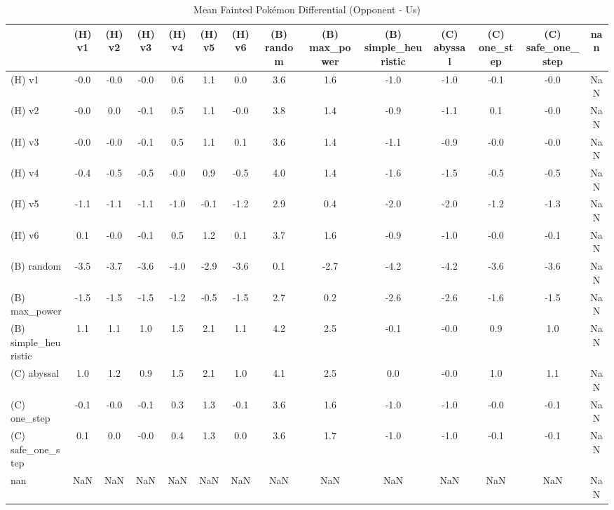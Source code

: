 \begin{table}[htbp]
\caption{Mean Fainted Pokémon Differential (Opponent - Us)}
\label{tab:fainted_diff}
\begin{tabular}{lccccccccccccc}
\hline
 & (H) v1 & (H) v2 & (H) v3 & (H) v4 & (H) v5 & (H) v6 & (B) random & (B) max\_power & (B) simple\_heuristic & (C) abyssal & (C) one\_step & (C) safe\_one\_step & nan \\
\hline
(H) v1 & -0.0 & -0.0 & -0.0 & 0.6 & 1.1 & 0.0 & 3.6 & 1.6 & -1.0 & -1.0 & -0.1 & -0.0 & NaN \\
(H) v2 & -0.0 & 0.0 & -0.1 & 0.5 & 1.1 & -0.0 & 3.8 & 1.4 & -0.9 & -1.1 & 0.1 & -0.0 & NaN \\
(H) v3 & -0.0 & -0.0 & -0.1 & 0.5 & 1.1 & 0.1 & 3.6 & 1.4 & -1.1 & -0.9 & -0.0 & -0.0 & NaN \\
(H) v4 & -0.4 & -0.5 & -0.5 & -0.0 & 0.9 & -0.5 & 4.0 & 1.4 & -1.6 & -1.5 & -0.5 & -0.5 & NaN \\
(H) v5 & -1.1 & -1.1 & -1.1 & -1.0 & -0.1 & -1.2 & 2.9 & 0.4 & -2.0 & -2.0 & -1.2 & -1.3 & NaN \\
(H) v6 & 0.1 & -0.0 & -0.1 & 0.5 & 1.2 & 0.1 & 3.7 & 1.6 & -0.9 & -1.0 & -0.0 & -0.1 & NaN \\
(B) random & -3.5 & -3.7 & -3.6 & -4.0 & -2.9 & -3.6 & 0.1 & -2.7 & -4.2 & -4.2 & -3.6 & -3.6 & NaN \\
(B) max\_power & -1.5 & -1.5 & -1.5 & -1.2 & -0.5 & -1.5 & 2.7 & 0.2 & -2.6 & -2.6 & -1.6 & -1.5 & NaN \\
(B) simple\_heuristic & 1.1 & 1.1 & 1.0 & 1.5 & 2.1 & 1.1 & 4.2 & 2.5 & -0.1 & -0.0 & 0.9 & 1.0 & NaN \\
(C) abyssal & 1.0 & 1.2 & 0.9 & 1.5 & 2.1 & 1.0 & 4.1 & 2.5 & 0.0 & -0.0 & 1.0 & 1.1 & NaN \\
(C) one\_step & -0.1 & -0.0 & -0.1 & 0.3 & 1.3 & -0.1 & 3.6 & 1.6 & -1.0 & -1.0 & -0.0 & -0.1 & NaN \\
(C) safe\_one\_step & 0.1 & 0.0 & -0.0 & 0.4 & 1.3 & 0.0 & 3.6 & 1.7 & -1.0 & -1.0 & -0.1 & -0.1 & NaN \\
nan & NaN & NaN & NaN & NaN & NaN & NaN & NaN & NaN & NaN & NaN & NaN & NaN & NaN \\
\hline
\end{tabular}
\end{table}
